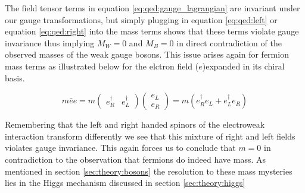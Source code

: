 The field tensor terms in equation \ref{eq:qed:gauge_lagrangian} are invariant
under our gauge transformations, but simply plugging in equation
\ref{eq:qed:left} or equation \ref{eq:qed:right} into the mass terms shows that
these terms violate gauge invariance thus implying $M_{W} = 0$ and $M_{B} = 0$
in direct contradiction of the observed masses of the weak gauge bosons.  This
issue arises again for fermion mass terms as illustrated below for the elctron
field ($e$)expanded in its chiral basis.

\begin{equation}
m\bar{e}e = m \left( \begin{matrix}e^{\dagger}_{R} &
e^{\dagger}_{L} \end{matrix} \right) \left( \begin{matrix} e_{L}
\\ e_{R} \end{matrix} \right) = m(e^{\dagger}_{R}e_{L} +
e^{\dagger}_{L}e_{R})
\end{equation}

Remembering that the left and right handed spinors of the electroweak
interaction transform differently we see that this mixture of right and left
fields violates gauge invariance. This again forces us to conclude that $m = 0$
in contradiction to the observation that fermions do indeed have mass. As
mentioned in section \ref{sec:theory:bosons} the resolution to these mass
mysteries lies in the Higgs mechanism discussed in section
\ref{sec:theory:higgs}
